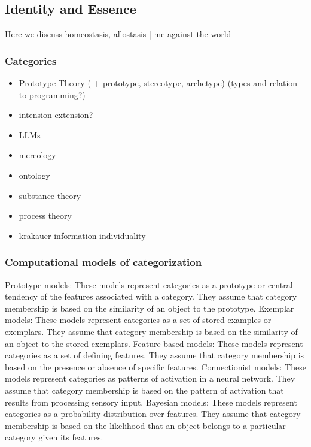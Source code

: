 \subsection{Identity and Essence}
Here we discuss homeostasis, allostasis | me against the world
\subsubsection{Categories}
\begin{itemize}
    \item Prototype Theory ( + prototype, stereotype, archetype) (types and relation to programming?)
    \item intension extension?
    \item LLMs
    \item mereology
    \item ontology
\end{itemize}

\begin{itemize}
    \item substance theory
    \item process theory
    \item krakauer information individuality
\end{itemize}

\subsubsection{Computational models of categorization}
Prototype models: These models represent categories as a prototype or central tendency of the features associated with a category. They assume that category membership is based on the similarity of an object to the prototype.
Exemplar models: These models represent categories as a set of stored examples or exemplars. They assume that category membership is based on the similarity of an object to the stored exemplars.
Feature-based models: These models represent categories as a set of defining features. They assume that category membership is based on the presence or absence of specific features.
Connectionist models: These models represent categories as patterns of activation in a neural network. They assume that category membership is based on the pattern of activation that results from processing sensory input.
Bayesian models: These models represent categories as a probability distribution over features. They assume that category membership is based on the likelihood that an object belongs to a particular category given its features.

